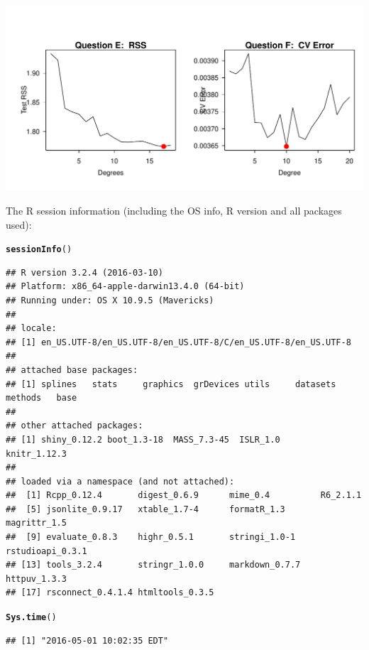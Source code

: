 \documentclass{article}\usepackage[]{graphicx}\usepackage[]{color}
\makeatletter
\newcommand{\hlstd}[1]{\textcolor[rgb]{0.345,0.345,0.345}{#1}}%
\newcommand{\hlkwd}[1]{\textcolor[rgb]{0.737,0.353,0.396}{\textbf{#1}}}%
\newenvironment{kframe}{%
 \def\at@end@of@kframe{}%
 \ifinner\ifhmode%
  \def\at@end@of@kframe{\end{minipage}}%
  \begin{minipage}{\columnwidth}%
 \fi\fi%
 \def\FrameCommand##1{\hskip\@totalleftmargin \hskip-\fboxsep
 \colorbox{shadecolor}{##1}\hskip-\fboxsep
     \hskip-\linewidth \hskip-\@totalleftmargin \hskip\columnwidth}%
 \MakeFramed {\advance\hsize-\width
   \@totalleftmargin\z@ \linewidth\hsize
   \@setminipage}}%
 {\par\unskip\endMakeFramed%
 \at@end@of@kframe}
\newenvironment{knitrout}{}{} %
\makeatother
\begin{document}
\begin{knitrout}
{\centering \includegraphics[width=.6\linewidth]{figure/Schmidt-HW7-Rnwunnamed-chunk-6-1} 

}



\end{knitrout}

The R session information (including the OS info, R version and all
packages used):

\begin{knitrout}
\color{fgcolor}\begin{kframe}
\begin{alltt}
\hlkwd{sessionInfo}\hlstd{()}
\end{alltt}
\begin{verbatim}
## R version 3.2.4 (2016-03-10)
## Platform: x86_64-apple-darwin13.4.0 (64-bit)
## Running under: OS X 10.9.5 (Mavericks)
## 
## locale:
## [1] en_US.UTF-8/en_US.UTF-8/en_US.UTF-8/C/en_US.UTF-8/en_US.UTF-8
## 
## attached base packages:
## [1] splines   stats     graphics  grDevices utils     datasets  methods   base     
## 
## other attached packages:
## [1] shiny_0.12.2 boot_1.3-18  MASS_7.3-45  ISLR_1.0     knitr_1.12.3
## 
## loaded via a namespace (and not attached):
##  [1] Rcpp_0.12.4       digest_0.6.9      mime_0.4          R6_2.1.1         
##  [5] jsonlite_0.9.17   xtable_1.7-4      formatR_1.3       magrittr_1.5     
##  [9] evaluate_0.8.3    highr_0.5.1       stringi_1.0-1     rstudioapi_0.3.1 
## [13] tools_3.2.4       stringr_1.0.0     markdown_0.7.7    httpuv_1.3.3     
## [17] rsconnect_0.4.1.4 htmltools_0.3.5
\end{verbatim}
\begin{alltt}
\hlkwd{Sys.time}\hlstd{()}
\end{alltt}
\begin{verbatim}
## [1] "2016-05-01 10:02:35 EDT"
\end{verbatim}
\end{kframe}
\end{knitrout}
\end{document}
